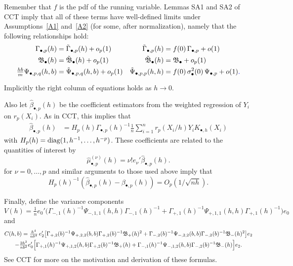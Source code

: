 \documentclass[12pt,fleqn]{article}
\providecommand{\DIFadd}[1]{{\protect\color{blue}\uwave{#1}}} %
\providecommand{\DIFaddbegin}{} %
\providecommand{\DIFaddend}{} %
\begin{document}
Remember that $f$ is the pdf of the running variable. Lemmas
SA1 and SA2 of CCT imply that all of these terms have well-defined limits under
Assumptions~\ref{A1} and~\ref{A2} (for some, after normalization), namely that
the following relationships hold:
\begin{align}
  \Gamma_{\bullet,p}(h) & = \Gammat_{\bullet,p}(h) + o_p(1) &
  \Gammat_{\bullet,p}(h) &= f(0) \, \Gamma_{\bullet,p} + o(1) \label{eq:10} \\
  \Bf_{\bullet}(h) &= \Bft_{\bullet}(h) + o_p(1) &
  \Bft_{\bullet}(h) &= \Bf_{\bullet} + o_p(1) \label{eq:11} \\
  \tfrac{hb}{m} \Psi_{\bullet,p,q}(h, b) &= \Psit_{\bullet,p,q}(h,b) + o_p(1) &
  \Psit_{\bullet,p,p}(h,h) &= f(0) \, \sigma^2_{\bullet}(0) \, \Psi_{\bullet,p} + o(1)\DIFaddbegin \DIFadd{. }\DIFaddend \label{eq:12}
\end{align}
Implicitly the right column of equations holds as $h \to 0$.

Also let $\hat\beta_{\bullet,p}(h)$ be the coefficient
estimators from the weighted regression of $Y_i$ on $r_p(X_i)$. As in CCT, this
implies that
\begin{align*}
  \hat\beta_{\bullet,p}(h) &= H_p(h) \Gamma_{\bullet,p}(h)^{-1}
  \tfrac{1}{n} \sum_{i=1}^n r_p(X_i/h) Y_i K_{\bullet,h}(X_i)
\end{align*}
with $H_p(h) = \operatorname{diag}(1, h^{-1}, \dots, h^{-p})$.
These coefficients are related to the quantities of interest by
\begin{equation*}
  \hat{\mu}_{\bullet,p}^{(\nu)}(h) = \nu! e_\nu' \hat\beta_{\bullet,p}(h).
\end{equation*}
for $\nu = 0,\dots,p$ and similar arguments to those used above imply that
\begin{equation*}
  H_p(h)^{-1}(\hat\beta_{\bullet,p}(h) - \beta_{\bullet,p}(h))= O_p(1/\sqrt{nh}).
\end{equation*}

Finally, define the variance components
\begin{equation}\label{eq:8}
  V(h)
  = \tfrac{1}{n} e_0' \big(\Gamma_{-,1}(h)^{-1} \Psi_{-,1,1}(h,h)
    \Gamma_{-,1}(h)^{-1}
  + \Gamma_{+,1}(h)^{-1} \Psi_{+,1,1}(h,h) \Gamma_{+,1}(h)^{-1} \big) e_0
\end{equation}
and
\begin{multline}\label{eq:13}
  C(h,b) =
  \tfrac{h^4}{n b^4} \, e_2' \big[
    \Gamma_{+,2}(b)^{-1} \Psi_{+,2,2}(b,b) \Gamma_{+,2}(b)^{-1} \mathfrak{B}_+(h)^2 +
    \Gamma_{-,2}(b)^{-1} \Psi_{-,2,2}(b,b) \Gamma_{-,2}(b)^{-1} \mathfrak{B}_-(h)^2
  \big] e_2 \\
  - \tfrac{2 h^2}{n b^{2}}
    e_0' \Big[
    \Gamma_{+,1}(h)^{-1} \Psi_{+,1,2}(h,b) \Gamma_{+,2}(b)^{-1} \mathfrak{B}_+(h) +
    \Gamma_{-,1}(h)^{-1} \Psi_{-,1,2}(h,b) \Gamma_{-,2}(b)^{-1} \mathfrak{B}_-(h)
    \Big] e_2.
\end{multline}
See CCT for more on the motivation and derivation of these formulas.
\end{document}
